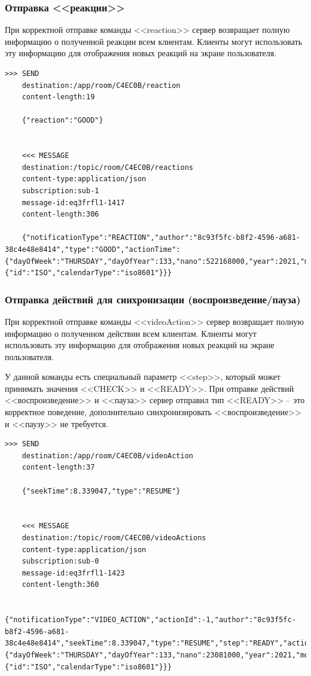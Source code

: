 \documentclass{../../includes/TechDocMultiAuthors}
\begin{document}
    \subsubsection{Отправка <<реакции>>}

    При корректной отправке команды <<reaction>> сервер возвращает полную информацию о полученной реакции всем клиентам.
    Клиенты могут использовать эту информацию для отображения новых реакций на экране пользователя.

    \begin{lstlisting}[language=text,caption={Запрос и ответ при отправке <<реакции>>}]
    >>> SEND
    destination:/app/room/C4EC0B/reaction
    content-length:19

    {"reaction":"GOOD"}


    <<< MESSAGE
    destination:/topic/room/C4EC0B/reactions
    content-type:application/json
    subscription:sub-1
    message-id:eq3frfl1-1417
    content-length:306

    {"notificationType":"REACTION","author":"8c93f5fc-b8f2-4596-a681-38c4e48e8414","type":"GOOD","actionTime":{"dayOfWeek":"THURSDAY","dayOfYear":133,"nano":522168000,"year":2021,"monthValue":5,"dayOfMonth":13,"hour":23,"minute":31,"second":50,"month":"MAY","chronology":{"id":"ISO","calendarType":"iso8601"}}}
    \end{lstlisting}

    \subsubsection{Отправка действий для синхронизации (воспроизведение/пауза)}

    При корректной отправке команды <<videoAction>> сервер возвращает полную информацию о полученном действии всем клиентам.
    Клиенты могут использовать эту информацию для отображения новых реакций на экране пользователя.

    У данной команды есть специальный параметр <<step>>, который может принимать значения <<CHECK>> и <<READY>>.
    При отправке действий <<воспроизведение>> и <<пауза>> сервер отправил тип <<READY>> -- это корректное поведение, дополнительно синхронизировать <<воспроизведение>> и <<паузу>> не требуется.

    \begin{lstlisting}[language=text,caption={Запрос и ответ при отправке действия для синхронизации}]
    >>> SEND
    destination:/app/room/C4EC0B/videoAction
    content-length:37

    {"seekTime":8.339047,"type":"RESUME"}


    <<< MESSAGE
    destination:/topic/room/C4EC0B/videoActions
    content-type:application/json
    subscription:sub-0
    message-id:eq3frfl1-1423
    content-length:360

    {"notificationType":"VIDEO_ACTION","actionId":-1,"author":"8c93f5fc-b8f2-4596-a681-38c4e48e8414","seekTime":8.339047,"type":"RESUME","step":"READY","actionTime":{"dayOfWeek":"THURSDAY","dayOfYear":133,"nano":23081000,"year":2021,"monthValue":5,"dayOfMonth":13,"hour":23,"minute":37,"second":34,"month":"MAY","chronology":{"id":"ISO","calendarType":"iso8601"}}}
    \end{lstlisting}
\end{document}
